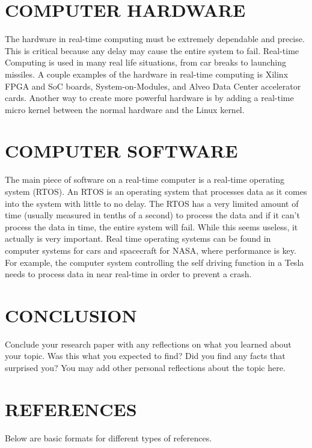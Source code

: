 \documentclass[letterpaper, 10 pt, conference]{IEEEconf}
\begin{document}
\section{COMPUTER HARDWARE}
The hardware in real-time computing must be extremely dependable and precise.
 This is critical because any delay may cause the entire system to fail.
  Real-time Computing is used in many real life situations, from car breaks to launching missiles. 
  A couple examples of the hardware in real-time computing is Xilinx FPGA and
   SoC boards, System-on-Modules, and Alveo Data Center accelerator cards.
    Another way to create more powerful hardware is by adding a real-time micro kernel 
    between the normal hardware and the Linux kernel. 

\section{COMPUTER SOFTWARE}

The main piece of software on a real-time computer is a real-time operating system (RTOS). An RTOS is an operating system
that processes data as it comes into the system with little to no delay. The RTOS has a very limited amount of time (usually
measured in tenths of a second) to process the data and if it can't process the data in time, the entire system will fail. While this seems useless, it actually
is very important. Real time operating systems can be found in computer systems for cars and spacecraft for NASA, where performance
is key. For example, the computer system controlling the self driving function in a Tesla needs to process data in near real-time
in order to prevent a crash.

\section{CONCLUSION}

Conclude your research paper with any reflections on what you
learned about your topic. Was this what you expected to find?
Did you find any facts that surprised you? You may add other
personal reflections about the topic here.

\section*{REFERENCES}

Below are basic formats for different types of references.
\end{document}
